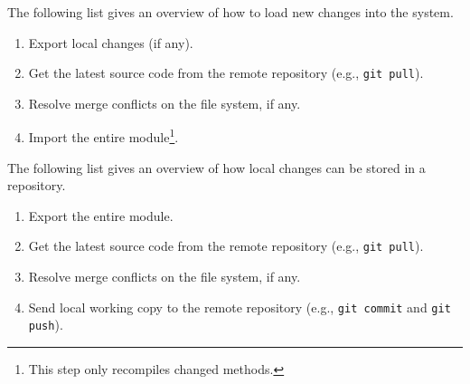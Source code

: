 The following list gives an overview of how to load new changes into the system.
\begin{enumerate}
	\item Export local changes (if any).
	\item Get the latest source code from the remote repository (e.g., \texttt{git pull}).
	\item Resolve merge conflicts on the file system, if any.
	\item Import the entire module\footnote{This step only recompiles changed methods.}.
\end{enumerate}

The following list gives an overview of how local changes can be stored in a repository.
\begin{enumerate}
	\item Export the entire module.
	\item Get the latest source code from the remote repository (e.g., \texttt{git pull}).
	\item Resolve merge conflicts on the file system, if any.
	\item Send local working copy to the remote repository (e.g., \texttt{git commit} and \texttt{git push}).
\end{enumerate}
